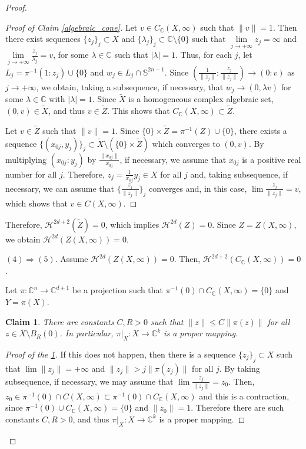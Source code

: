\documentclass[a4paper,11pt]{amsart}
\newtheorem{claim}{Claim}[theorem]
\newcommand{\C}{\mathbb C}
\begin{document}
\begin{proof}
\begin{proof}[Proof of Claim \ref{algebraic_cone}]
Let $v\in C_{\C}(X,\infty)$ such that $\|v\|=1$. Then there exist sequences $\{z_j\}_j\subset X$ and $\{\lambda_j\}_j\subset \C\setminus\{0\}$ such that $\lim\limits_{j\to +\infty} z_j=\infty$ and $\lim\limits_{j\to +\infty} \frac{z_j}{\lambda_j}=v$, for some $\lambda\in \C$ such that $|\lambda|=1$. Thus, for each $j$, let $L_j=\pi^{-1}(1:z_j)\cup \{0\}$ and $w_j\in L_j\cap \mathbb{S}^{2n-1}$. Since $(\frac{1}{\|z_j\|}:\frac{z_j}{\|z_j\|})\to (0:v)$ as $j\to +\infty$, we obtain, taking a subsequence, if necessary, that $w_j\to (0,\lambda v)$ for some $\lambda \in \C$ with $|\lambda|=1$. Since $\widetilde{X}$ is a homogeneous complex algebraic set, $(0,v)\in \widetilde{X}$, and thus $v\in \widetilde{Z}$.
This shows that $C_{\C}(X,\infty)\subset \widetilde{Z}$.

Let $v\in \widetilde{Z} $ such that $\|v\|=1$. Since $\{0\}\times \widetilde{Z}=\pi^{-1}(Z)\cup \{0\}$, there exists a sequence $\{(x_{0j},y_j)\}_j\subset  \widetilde{X} \setminus (\{0\}\times \widetilde{Z})$ which converges to $(0,v)$. By multiplying $(x_{0j}:y_j)$ by $\frac{\|x_{0j}\|}{x_{0j}}$, if necessary, we assume that $x_{0j}$ is a positive real number for all $j$. Therefore, $z_j=\frac{1}{x_{0j}}y_j\in X$ for all $j$ and, taking subsequence, if necessary, we can assume that $\{\frac{z_j}{\|z_j\|}\}_j$ converges and, in this case, $\lim \frac{z_{j}}{\|z_{j}\|}=v$, which shows that $v\in C(X,\infty)$.
\end{proof}
Therefore, $\mathcal{H}^{2d+2}(\widetilde{Z})=0$, which implies $\mathcal{H}^{2d}(Z)=0$. Since $Z=Z(X,\infty)$, we obtain $\mathcal{H}^{2d}(Z(X,\infty))=0$.

\bigskip

\noindent $(4) \Longrightarrow (5)$. Assume $\mathcal{H}^{2d}(Z(X,\infty))=0$.
Then, $\mathcal{H}^{2d+2}(C_{\C}(X,\infty))=0$.

Let $\pi\colon \mathbb{C}^{n}\to \mathbb{C}^{d+1}$ be a projection such that $\pi^{-1}(0)\cap C_{\mathbb{C}}(X,\infty)=\{0\}$ and $Y=\pi(X)$.

\begin{claim}\label{claim:proper_map}
 There are constants $C,R>0$ such that $\|z\|\leq C\|\pi(z)\|$ for all $z\in X\setminus B_R(0)$. In particular, $\pi|_X\colon X\to \C^{k}$ is a proper mapping. 
\end{claim}
\begin{proof}[Proof of the \ref{claim:proper_map}]
If this does not happen, then there is a sequence $\{z_j\}_j\subset X$ such that $\lim\|z_j\|=+\infty$ and $\|z_j\|>j\|\pi(z_j)\|$ for all $j$. By taking subsequence, if necessary, we may assume that $\lim\frac{z_j}{\|z_j\|}=z_0$. Then, $z_0\in \pi^{-1}(0)\cap C(X,\infty)\subset \pi^{-1}(0)\cap C_{\C}(X,\infty)$ and this is a contraction, since $\pi^{-1}(0)\cup C_{\C}(X,\infty)=\{0\}$ and $\|z_0\|=1$. Therefore there are such constants $C,R>0$, and thus $\pi|_X\colon X\to \C^{k}$ is a proper mapping.
\end{proof}


\end{proof}
\end{document}
